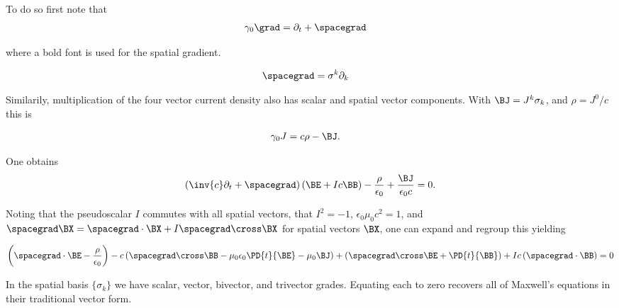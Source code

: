 To do so first note that 
\begin{align*}
\gamma_0 \grad &= \partial_t + \spacegrad 
\end{align*}

where a bold font is used for the spatial gradient.

\begin{align*}
\spacegrad &= \sigma^k \partial_k
\end{align*}

Similarily, multiplication of the four vector current density also has scalar and spatial vector components.  With $\BJ = J^k \sigma_k$, and $\rho = J^0/c$ this is

\begin{align*}
\gamma_0 J &= c \rho - \BJ.
\end{align*}

One obtains
\begin{align*}
\left( \inv{c} \partial_t + \spacegrad \right) (\BE + I c \BB) - \frac{\rho}{\epsilon_0} + \frac{\BJ}{\epsilon_0 c} = 0.
\end{align*}

Noting that the pseudoscalar $I$ commutes with all spatial vectors, that $I^2 = -1$, $\epsilon_0 \mu_0 c^2 = 1$, and $\spacegrad \BX = \spacegrad \cdot \BX + I \spacegrad \cross \BX$ for spatial vectors $\BX$, one can expand and regroup this yielding

\begin{align*}
\left( \spacegrad \cdot \BE - \frac{\rho}{\epsilon_0} \right)
- 
c \left( \spacegrad \cross \BB - \mu_0 \epsilon_0 \PD{t}{\BE} - \mu_0 \BJ \right)
+ \left( \spacegrad \cross \BE + \PD{t}{\BB} \right)
+ I c \left( \spacegrad \cdot \BB \right)
= 0 
\end{align*}

In the spatial basis $\{\sigma_k\}$ we have scalar, vector, bivector, and trivector grades.  Equating each to zero recovers all of Maxwell's equations in their traditional vector form.

\EndNoBibArticle
